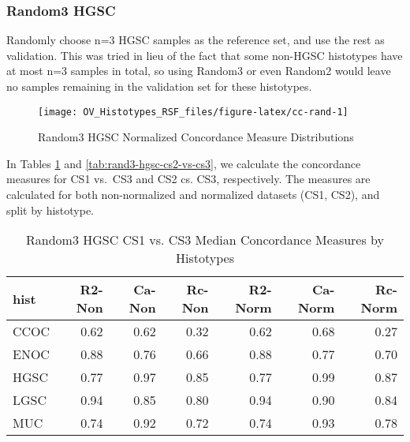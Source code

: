 \documentclass[
]{report}
\begin{document}
\hypertarget{random3-hgsc}{%
\subsubsection{Random3 HGSC}\label{random3-hgsc}}

Randomly choose n=3 HGSC samples as the reference set, and use the rest as validation. This was tried in lieu of the fact that some non-HGSC histotypes have at most n=3 samples in total, so using Random3 or even Random2 would leave no samples remaining in the validation set for these histotypes.

\begin{figure}[H]

{\centering \texttt{[image: OV\_Histotypes\_RSF\_files/figure-latex/cc-rand-1]} 

}

\caption{Random3 HGSC Normalized Concordance Measure Distributions}\label{fig:cc-rand}
\end{figure}

In Tables \ref{tab:rand3-hgsc-cs1-vs-cs3} and \ref{tab:rand3-hgsc-cs2-vs-cs3}, we calculate the concordance measures for CS1 vs.~CS3 and CS2 cs. CS3, respectively. The measures are calculated for both non-normalized and normalized datasets (CS1, CS2), and split by histotype.

\begin{table}

\caption{\label{tab:rand3-hgsc-cs1-vs-cs3}Random3 HGSC CS1 vs. CS3 Median Concordance Measures by Histotypes}
\centering
\begin{tabular}[t]{l|r|r|r|r|r|r}
\hline
hist & R2-Non & Ca-Non & Rc-Non & R2-Norm & Ca-Norm & Rc-Norm\\
\hline
CCOC & 0.62 & 0.62 & 0.32 & 0.62 & 0.68 & 0.27\\
\hline
ENOC & 0.88 & 0.76 & 0.66 & 0.88 & 0.77 & 0.70\\
\hline
HGSC & 0.77 & 0.97 & 0.85 & 0.77 & 0.99 & 0.87\\
\hline
LGSC & 0.94 & 0.85 & 0.80 & 0.94 & 0.90 & 0.84\\
\hline
MUC & 0.74 & 0.92 & 0.72 & 0.74 & 0.93 & 0.78\\
\hline
\end{tabular}
\end{table}
\end{document}
